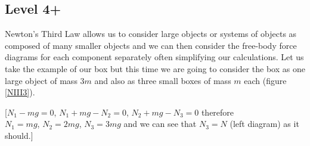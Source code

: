 \subsection{Level 4+}
Newton's Third Law allows us to consider large objects or systems of objects as composed of many smaller objects and we can then consider the free-body force diagrams for each component separately  often simplifying our calculations.\nl
Let us take the example of our box but this time we are going to consider the box as one large object of mass $3m$ and also as three small boxes of mass $m$ each (figure \ref{NIII3}).\nl

\noindent {}\nl
{\color{red}[$N_1-mg=0$, $N_1+mg-N_2=0$, $N_2+mg-N_3=0$ therefore \\
$N_1=mg$, $N_2=2mg$, $N_3=3mg$ and we can see that $N_3=N$ (left diagram) as it should.]\color{black}}





